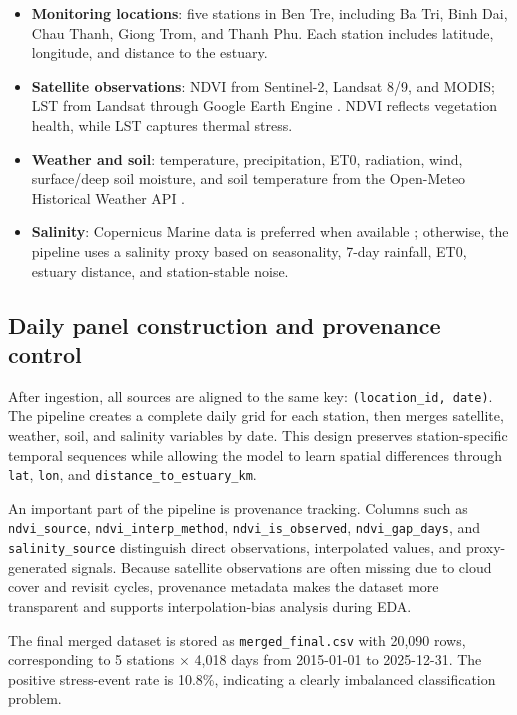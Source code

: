 \documentclass[a4paper, 11pt]{article}
\begin{document}
\begin{itemize}[leftmargin=1.2em, itemsep=1pt]
    \item \textbf{Monitoring locations}: five stations in Ben Tre, including Ba Tri, Binh Dai, Chau Thanh, Giong Trom, and Thanh Phu. Each station includes latitude, longitude, and distance to the estuary.
    \item \textbf{Satellite observations}: NDVI from Sentinel-2, Landsat 8/9, and MODIS; LST from Landsat through Google Earth Engine \cite{gorelick2017gee}. NDVI reflects vegetation health, while LST captures thermal stress.
    \item \textbf{Weather and soil}: temperature, precipitation, ET0, radiation, wind, surface/deep soil moisture, and soil temperature from the Open-Meteo Historical Weather API \cite{openmeteo}.
    \item \textbf{Salinity}: Copernicus Marine data is preferred when available \cite{copernicusmarine}; otherwise, the pipeline uses a salinity proxy based on seasonality, 7-day rainfall, ET0, estuary distance, and station-stable noise.
\end{itemize}

\subsection{Daily panel construction and provenance control}

After ingestion, all sources are aligned to the same key: \texttt{(location\_id, date)}. The pipeline creates a complete daily grid for each station, then merges satellite, weather, soil, and salinity variables by date. This design preserves station-specific temporal sequences while allowing the model to learn spatial differences through \texttt{lat}, \texttt{lon}, and \texttt{distance\_to\_estuary\_km}.

An important part of the pipeline is provenance tracking. Columns such as \texttt{ndvi\_source}, \texttt{ndvi\_interp\_method}, \texttt{ndvi\_is\_observed}, \texttt{ndvi\_gap\_days}, and \texttt{salinity\_source} distinguish direct observations, interpolated values, and proxy-generated signals. Because satellite observations are often missing due to cloud cover and revisit cycles, provenance metadata makes the dataset more transparent and supports interpolation-bias analysis during EDA.

The final merged dataset is stored as \texttt{merged\_final.csv} with 20,090 rows, corresponding to 5 stations $\times$ 4,018 days from 2015-01-01 to 2025-12-31. The positive stress-event rate is 10.8\%, indicating a clearly imbalanced classification problem.
\end{document}
